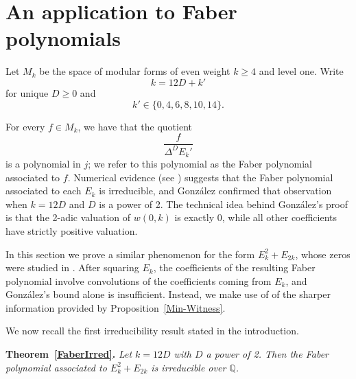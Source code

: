 \documentclass[12pt]{amsart}
\begin{document}
\section{An application to Faber polynomials} \label{application}

Let $M_k$ be the space of modular forms of even weight $k\ge 4$ and level one. Write \[k=12D+k'\] for unique $D\ge 0$ and \[k'\in\{0,4,6,8,10,14\}.\] %

For every $f\in M_k$, we have that the quotient \[ \frac{f}{\Delta^D E_k'}\] is a polynomial in $j$; we refer to this polynomial as the Faber polynomial associated to $f$. Numerical evidence (see \cite{Gekeler}) suggests that the Faber polynomial associated to each $E_k$ is irreducible, and Gonz\'alez confirmed that observation when $k=12D$ and $D$ is a power of 2. The technical idea behind Gonz\'alez's proof is that the 2-adic valuation of $w(0,k)$ is exactly 0, while all other coefficients have strictly positive valuation. 

In this section we prove a similar phenomenon for the form $E_k^2 + E_{2k}$, whose zeros were studied in \cite{klangwang}. After squaring $E_k$, the coefficients of the resulting Faber polynomial involve convolutions of the coefficients coming from $E_k$, and Gonz\'alez's bound alone is insufficient. Instead, we make use of of the sharper information provided by Proposition~\ref{Min-Witness}. 

We now recall the first irreducibility result stated in the introduction.

\medskip

\noindent\textbf{Theorem~\ref{FaberIrred}.}
\textit{Let $k=12D$ with $D$ a power of 2. Then the Faber polynomial associated to $E_k^2+E_{2k}$ is irreducible over $\mathbb{Q}$. }

\medskip
\end{document}
